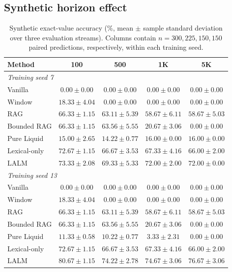 \documentclass[conference]{IEEEtran}
\begin{document}
\subsection{Synthetic horizon effect}
\begin{table}[t]
\centering
\small
\caption{Synthetic exact-value accuracy (\%, mean $\pm$ sample standard
deviation over three evaluation streams). Columns contain
$n=300,225,150,150$ paired predictions, respectively, within each training
seed.}
\label{tab:synthetic}
\begin{tabular}{lcccc}
\toprule
Method & 100 & 500 & 1K & 5K\\
\midrule
\multicolumn{5}{l}{\emph{Training seed 7}}\\
Vanilla & $0.00\!\pm\!0.00$ & $0.00\!\pm\!0.00$ & $0.00\!\pm\!0.00$ & $0.00\!\pm\!0.00$\\
Window & $18.33\!\pm\!4.04$ & $0.00\!\pm\!0.00$ & $0.00\!\pm\!0.00$ & $0.00\!\pm\!0.00$\\
RAG & $66.33\!\pm\!1.15$ & $63.11\!\pm\!5.39$ & $58.67\!\pm\!6.11$ & $58.67\!\pm\!5.03$\\
Bounded RAG & $66.33\!\pm\!1.15$ & $63.56\!\pm\!5.55$ & $20.67\!\pm\!3.06$ & $0.00\!\pm\!0.00$\\
Pure Liquid & $15.00\!\pm\!2.65$ & $14.22\!\pm\!0.77$ & $16.00\!\pm\!0.00$ & $16.00\!\pm\!0.00$\\
Lexical-only & $72.67\!\pm\!1.15$ & $66.67\!\pm\!3.53$ & $67.33\!\pm\!4.16$ & $66.00\!\pm\!2.00$\\
LALM & $\mathbf{73.33}\!\pm\!2.08$ & $\mathbf{69.33}\!\pm\!5.33$ & $\mathbf{72.00}\!\pm\!2.00$ & $\mathbf{72.00}\!\pm\!0.00$\\
\midrule
\multicolumn{5}{l}{\emph{Training seed 13}}\\
Vanilla & $0.00\!\pm\!0.00$ & $0.00\!\pm\!0.00$ & $0.00\!\pm\!0.00$ & $0.00\!\pm\!0.00$\\
Window & $18.33\!\pm\!4.04$ & $0.00\!\pm\!0.00$ & $0.00\!\pm\!0.00$ & $0.00\!\pm\!0.00$\\
RAG & $66.33\!\pm\!1.15$ & $63.11\!\pm\!5.39$ & $58.67\!\pm\!6.11$ & $58.67\!\pm\!5.03$\\
Bounded RAG & $66.33\!\pm\!1.15$ & $63.56\!\pm\!5.55$ & $20.67\!\pm\!3.06$ & $0.00\!\pm\!0.00$\\
Pure Liquid & $11.33\!\pm\!0.58$ & $10.22\!\pm\!0.77$ & $3.33\!\pm\!2.31$ & $0.00\!\pm\!0.00$\\
Lexical-only & $72.67\!\pm\!1.15$ & $66.67\!\pm\!3.53$ & $67.33\!\pm\!4.16$ & $66.00\!\pm\!2.00$\\
LALM & $\mathbf{80.67}\!\pm\!1.15$ & $\mathbf{74.22}\!\pm\!2.78$ & $\mathbf{74.67}\!\pm\!3.06$ & $\mathbf{76.67}\!\pm\!3.06$\\
\bottomrule
\end{tabular}
\end{table}
\end{document}
